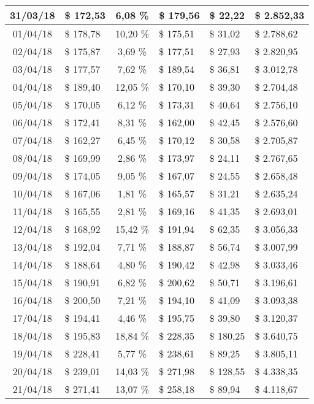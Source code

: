 \begin{center}
\begin{small}
\begin{longtable}{|c|l|c|l|l|l|}
31/03/18 & \$ 172,53 & 6,08 \% & \$ 179,56 & \$ 22,22 & \$ 2.852,33 \\ \hline
01/04/18 & \$ 178,78 & 10,20 \% & \$ 175,51 & \$ 31,02 & \$ 2.788,62 \\ \hline
02/04/18 & \$ 175,87 & 3,69 \% & \$ 177,51 & \$ 27,93 & \$ 2.820,95 \\ \hline
03/04/18 & \$ 177,57 & 7,62 \% & \$ 189,54 & \$ 36,81 & \$ 3.012,78 \\ \hline
04/04/18 & \$ 189,40 & 12,05 \% & \$ 170,10 & \$ 39,30 & \$ 2.704,48 \\ \hline
05/04/18 & \$ 170,05 & 6,12 \% & \$ 173,31 & \$ 40,64 & \$ 2.756,10 \\ \hline
06/04/18 & \$ 172,41 & 8,31 \% & \$ 162,00 & \$ 42,45 & \$ 2.576,60 \\ \hline
07/04/18 & \$ 162,27 & 6,45 \% & \$ 170,12 & \$ 30,58 & \$ 2.705,87 \\ \hline
08/04/18 & \$ 169,99 & 2,86 \% & \$ 173,97 & \$ 24,11 & \$ 2.767,65 \\ \hline
09/04/18 & \$ 174,05 & 9,05 \% & \$ 167,07 & \$ 24,55 & \$ 2.658,48 \\ \hline
10/04/18 & \$ 167,06 & 1,81 \% & \$ 165,57 & \$ 31,21 & \$ 2.635,24 \\ \hline
11/04/18 & \$ 165,55 & 2,81 \% & \$ 169,16 & \$ 41,35 & \$ 2.693,01 \\ \hline
12/04/18 & \$ 168,92 & 15,42 \% & \$ 191,94 & \$ 62,35 & \$ 3.056,33 \\ \hline
13/04/18 & \$ 192,04 & 7,71 \% & \$ 188,87 & \$ 56,74 & \$ 3.007,99 \\ \hline
14/04/18 & \$ 188,64 & 4,80 \% & \$ 190,42 & \$ 42,98 & \$ 3.033,46 \\ \hline
15/04/18 & \$ 190,91 & 6,82 \% & \$ 200,62 & \$ 50,71 & \$ 3.196,61 \\ \hline
16/04/18 & \$ 200,50 & 7,21 \% & \$ 194,10 & \$ 41,09 & \$ 3.093,38 \\ \hline
17/04/18 & \$ 194,41 & 4,46 \% & \$ 195,75 & \$ 39,80 & \$ 3.120,37 \\ \hline
18/04/18 & \$ 195,83 & 18,84 \% & \$ 228,35 & \$ 180,25 & \$ 3.640,75 \\ \hline
19/04/18 & \$ 228,41 & 5,77 \% & \$ 238,61 & \$ 89,25 & \$ 3.805,11 \\ \hline
20/04/18 & \$ 239,01 & 14,03 \% & \$ 271,98 & \$ 128,55 & \$ 4.338,35 \\ \hline
21/04/18 & \$ 271,41 & 13,07 \% & \$ 258,18 & \$ 89,94 & \$ 4.118,67 \\ \hline

\end{longtable}
\end{small}
\end{center}
